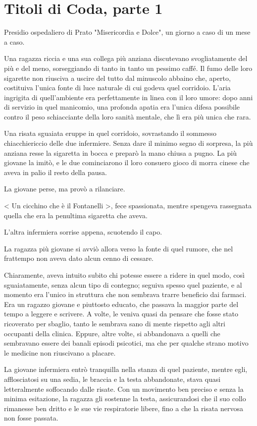 \chapter{Titoli di Coda, parte 1}

Presidio ospedaliero di Prato "Misericordia e Dolce", un giorno a caso di un mese a caso.

Una ragazza riccia e una sua collega più anziana discutevano svogliatamente del più e del meno, sorseggiando di tanto in tanto un pessimo caffé. Il fumo delle loro sigarette non riusciva a uscire del tutto dal minuscolo abbaino che, aperto, costituiva l'unica fonte di luce naturale di cui godeva quel corridoio. L'aria ingrigita di quell'ambiente era perfettamente in linea con il loro umore: dopo anni di servizio in quel manicomio, una profonda apatia era l'unica difesa possibile contro il peso schiacciante della loro sanità mentale, che lì era più unica che rara.

Una risata sguaiata eruppe in quel corridoio, sovrastando il sommesso chiacchiericcio delle due infermiere. Senza dare il minimo segno di sorpresa, la più anziana resse la sigaretta in bocca e preparò la mano chiusa a pugno. La più giovane la imitò, e le due cominciarono il loro consuero gioco di morra cinese che aveva in palio il resto della pausa.

La giovane perse, ma provò a rilanciare.

< Un cicchino che è il Fontanelli >, fece spassionata, mentre spengeva rassegnata quella che era la penultima sigaretta che aveva.

L'altra infermiera sorrise appena, scuotendo il capo. 

La ragazza più giovane si avviò allora verso la fonte di quel rumore, che nel frattempo non aveva dato alcun cenno di cessare. 

Chiaramente, aveva intuito subito chi potesse essere a ridere in quel modo, così sguaiatamente, senza alcun tipo di contegno; seguiva spesso quel paziente, e al momento era l'unico in struttura che non sembrava trarre beneficio dai farmaci. Era un ragazzo giovane e piuttosto educato, che passava la maggior parte del tempo a leggere e scrivere. A volte, le veniva quasi da pensare che fosse stato ricoverato per sbaglio, tanto le sembrava sano di mente rispetto agli altri occupanti della clinica. Eppure, altre volte, si abbandonava a quelli che sembravano essere dei banali episodi psicotici, ma che per qualche strano motivo le medicine non riuscivano a placare.

La giovane infermiera entrò tranquilla nella stanza di quel paziente, mentre egli, afflosciatosi su una sedia, le braccia e la testa abbandonate, stava quasi letteralmente soffocando dalle risate. Con un movimento ben preciso e senza la minima esitazione, la ragazza gli sostenne la testa, assicurandosi che il suo collo rimanesse ben dritto e le sue vie respiratorie libere, fino a che la risata nervosa non fosse passata.

